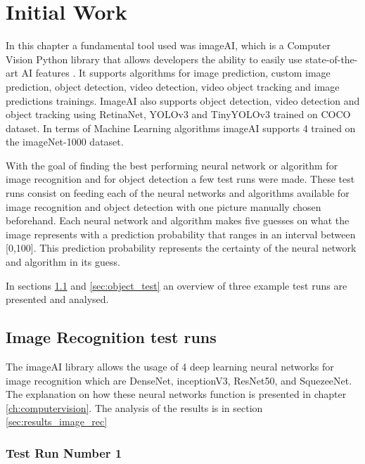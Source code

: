 \cleardoublepage

\chapter{Initial Work}
\label{ch:initial_work}

\par In this chapter a fundamental tool used was imageAI, which is a Computer Vision Python library that allows developers the ability to easily use state-of-the-art AI features . It supports algorithms for image prediction, custom image prediction, object detection, video detection, video object tracking and image predictions trainings. ImageAI also supports object detection, video detection and object tracking using RetinaNet, YOLOv3 and TinyYOLOv3 trained on COCO dataset. In terms of Machine Learning algorithms imageAI supports 4 trained on the imageNet-1000 dataset. \cite{ImageAI}


\par With the goal of finding the best performing neural network or algorithm for image recognition and for object detection a few test runs were made. These test runs consist on feeding each of the neural networks and algorithms available for image recognition and object detection with one picture manually chosen beforehand. Each neural network and algorithm makes five guesses on what the image represents with a prediction probability that ranges in an interval between [0,100]. This prediction probability represents the certainty of the neural network and algorithm in its guess.
\par In sections \ref{sec:image_test} and \ref{sec:object_test} an overview of three example test runs are presented and analysed.



\section{Image Recognition test runs}
\label{sec:image_test}

\par The imageAI library allows the usage of 4 deep learning neural networks for image recognition which are DenseNet, inceptionV3, ResNet50, and SquezeeNet. The explanation on how these neural networks function is presented in chapter \ref{ch:computervision}. The analysis of the results is in section  \ref{sec:results_image_rec}



    \newpage
    \subsection{Test Run Number 1}

